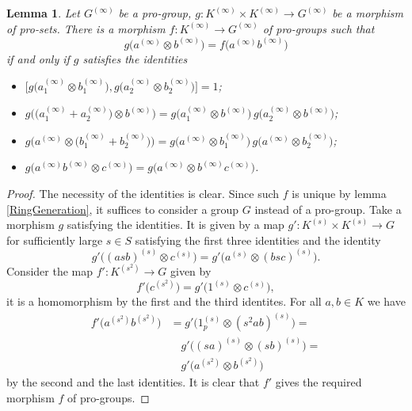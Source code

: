 \documentclass{article}
\newtheorem{lemma}{Lemma}
\newcommand{\rar}{\rightarrow}
\begin{document}
\begin{lemma}\label{RingPresentation}
Let \(G^{(\infty)}\) be a pro-group, \(g \colon K^{(\infty)} \times K^{(\infty)} \rar G^{(\infty)}\) be a morphism of pro-sets. There is a morphism \(f \colon K^{(\infty)} \rar G^{(\infty)}\) of pro-groups such that
\[g\bigl(a^{(\infty)} \otimes b^{(\infty)}\bigr) = f\bigl(a^{(\infty)} b^{(\infty)}\bigr)\]
if and only if \(g\) satisfies the identities
\begin{itemize}
\item \(\bigl[g\bigl(a_1^{(\infty)} \otimes b_1^{(\infty)}\bigr), g\bigl(a_2^{(\infty)} \otimes b_2^{(\infty)}\bigr)\bigr] = 1\);
\item \(g\bigl(\bigl(a_1^{(\infty)} + a_2^{(\infty)}\bigr) \otimes b^{(\infty)}\bigr) = g\bigl(a_1^{(\infty)} \otimes b^{(\infty)}\bigr)\, g\bigl(a_2^{(\infty)} \otimes b^{(\infty)}\bigr)\);
\item \(g\bigl(a^{(\infty)} \otimes \bigl(b_1^{(\infty)} + b_2^{(\infty)}\bigr)\bigr) = g\bigl(a^{(\infty)} \otimes b_1^{(\infty)}\bigr)\, g\bigl(a^{(\infty)} \otimes b_2^{(\infty)}\bigr)\);
\item \(g\bigl(a^{(\infty)} b^{(\infty)} \otimes c^{(\infty)}\bigr) = g\bigl(a^{(\infty)} \otimes b^{(\infty)} c^{(\infty)}\bigr)\).
\end{itemize}
\end{lemma}
\begin{proof}
The necessity of the identities is clear. Since such \(f\) is unique by lemma \ref{RingGeneration}, it suffices to consider a group \(G\) instead of a pro-group. Take a morphism \(g\) satisfying the identities. It is given by a map \(g' \colon K^{(s)} \times K^{(s)} \rar G\) for sufficiently large \(s \in S\) satisfying the first three identities and the identity 
\[g'\bigl((asb)^{(s)} \otimes c^{(s)}\bigr) = g'\bigl(a^{(s)} \otimes (bsc)^{(s)}\bigr).\]
Consider the map \(f' \colon K^{(s^2)} \rar G\) given by
\[f'\bigl(c^{(s^2)}\bigr) = g'\bigl(1^{(s)} \otimes c^{(s)}\bigr),\]
it is a homomorphism by the first and the third identites. For all \(a, b \in K\) we have
\begin{align*}
f'\bigl(a^{(s^2)} b^{(s^2)})
&= g' \bigl( 1^{(s)}_p \otimes (s^2 ab)^{(s)} \bigr) =\\
&\quad g' \bigl( (sa)^{(s)} \otimes (sb)^{(s)} \bigr) =\\
&\quad g' \bigl(a^{(s^2)} \otimes b^{(s^2)}\bigr)
\end{align*}
by the second and the last identities. It is clear that \(f'\) gives the required morphism \(f\) of pro-groups.
\end{proof}

\printbibliography
\end{document}
